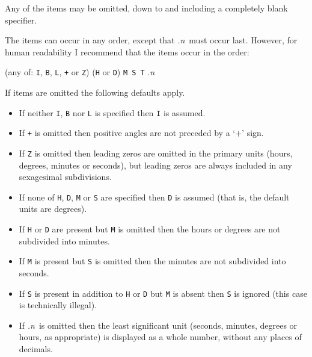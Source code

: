 \documentclass[11pt,twoside]{starlink}
\begin{document}
Any of the items may be omitted, down to and including a
completely blank specifier.

The items can occur in any order, except that \textit{.n}\, must
occur last. However, for human readability I recommend that the
items occur in the order:

\begin{center}
(any of: \texttt{I}, \texttt{B}, \texttt{L}, \texttt{+} or \texttt{Z}) (\texttt{H}
or \texttt{D}) \texttt{M S T} .\textit{n}
\end{center}

If items are omitted the following defaults apply.

\begin{itemize}

  \item If neither \texttt{I}, \texttt{B} nor \texttt{L} is specified
   then \texttt{I} is assumed.

  \item If \texttt{+} is omitted then positive angles are not
   preceded by a `$+$' sign.

  \item If \texttt{Z} is omitted then leading zeros are omitted in the
   primary units (hours, degrees, minutes or seconds), but leading zeros
   are always included in any sexagesimal subdivisions.

  \item If none of \texttt{H}, \texttt{D}, \texttt{M} or \texttt{S} are specified
   then \texttt{D} is assumed (that is, the default units are degrees).

  \item If \texttt{H} or \texttt{D} are present but \texttt{M} is omitted then
   the hours or degrees are not subdivided into minutes.

  \item If \texttt{M} is present but \texttt{S} is omitted then the minutes
   are not subdivided into seconds.

  \item If \texttt{S} is present in addition to \texttt{H} or \texttt{D} but
   \texttt{M} is absent then \texttt{S} is ignored (this case is technically
   illegal).

  \item If \textit{.n}\, is omitted then the least significant unit
   (seconds, minutes, degrees or hours, as appropriate) is
   displayed as a whole number, without any places of decimals.

\end{itemize}
\end{document}
